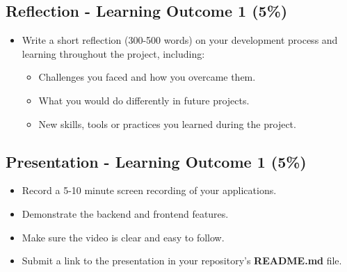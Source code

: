 \documentclass{article}
\begin{document}
\subsection*{Reflection - Learning Outcome 1 (5\%)}
\begin{itemize}
  \item Write a short reflection (300-500 words) on your development process and learning throughout the project, including:
  \begin{itemize}
    \item Challenges you faced and how you overcame them.
    \item What you would do differently in future projects.
    \item New skills, tools or practices you learned during the project.
  \end{itemize}
\end{itemize}

\subsection*{Presentation - Learning Outcome 1 (5\%)}
\begin{itemize}
  \item Record a 5-10 minute screen recording of your applications.
  \item Demonstrate the backend and frontend features.
  \item Make sure the video is clear and easy to follow.
  \item Submit a link to the presentation in your repository's \textbf{README.md} file.
\end{itemize}
\end{document}
